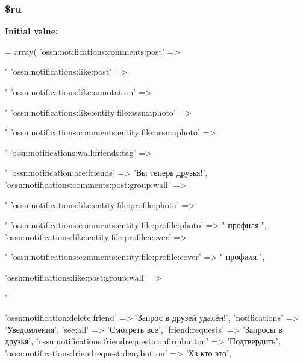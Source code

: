 \subsubsection[{\texorpdfstring{\$ru}{$ru}}]{\setlength{\rightskip}{0pt plus 5cm}\$ru}\hypertarget{components_2_ossn_notifications_2locale_2ossn_8ru_8php_aab84a3feda2b0e489cac7cd194e8d726}{}\label{components_2_ossn_notifications_2locale_2ossn_8ru_8php_aab84a3feda2b0e489cac7cd194e8d726}
{\bfseries Initial value\+:}
\begin{DoxyCode}
= array(
    \textcolor{stringliteral}{'ossn:notifications:comments:post'} => \textcolor{stringliteral}{"%
    \textcolor{stringliteral}{'ossn:notifications:like:post'} => \textcolor{stringliteral}{"%
    \textcolor{stringliteral}{'ossn:notifications:like:annotation'} => \textcolor{stringliteral}{"%
    \textcolor{stringliteral}{'ossn:notifications:like:entity:file:ossn:aphoto'} => \textcolor{stringliteral}{"%
    \textcolor{stringliteral}{'ossn:notifications:comments:entity:file:ossn:aphoto'} => \textcolor{stringliteral}{'%
    \textcolor{stringliteral}{'ossn:notifications:wall:friends:tag'} => \textcolor{stringliteral}{'%
    \textcolor{stringliteral}{'ossn:notification:are:friends'} => \textcolor{stringliteral}{'Вы теперь друзья!'},
    \textcolor{stringliteral}{'ossn:notifications:comments:post:group:wall'} => \textcolor{stringliteral}{"%
    \textcolor{stringliteral}{'ossn:notifications:like:entity:file:profile:photo'} => \textcolor{stringliteral}{"%
    \textcolor{stringliteral}{'ossn:notifications:comments:entity:file:profile:photo'} => \textcolor{stringliteral}{"%
       профиля."},
    \textcolor{stringliteral}{'ossn:notifications:like:entity:file:profile:cover'} => \textcolor{stringliteral}{"%
    \textcolor{stringliteral}{'ossn:notifications:comments:entity:file:profile:cover'} => \textcolor{stringliteral}{"%
       профиля."},

    \textcolor{stringliteral}{'ossn:notifications:like:post:group:wall'} => \textcolor{stringliteral}{'%
    
    \textcolor{stringliteral}{'ossn:notification:delete:friend'} => \textcolor{stringliteral}{'Запрос в друзей удалён!'},
    \textcolor{stringliteral}{'notifications'} => \textcolor{stringliteral}{'Уведомления'},
    \textcolor{stringliteral}{'see:all'} => \textcolor{stringliteral}{'Смотреть все'},
    \textcolor{stringliteral}{'friend:requests'} => \textcolor{stringliteral}{'Запросы в друзья'},
    \textcolor{stringliteral}{'ossn:notifications:friendrequest:confirmbutton'} => \textcolor{stringliteral}{'Подтвердить'},
    \textcolor{stringliteral}{'ossn:notifications:friendrequest:denybutton'} => \textcolor{stringliteral}{'Хз кто это'},
    
}}}}}}}}}}
\end{DoxyCode}
